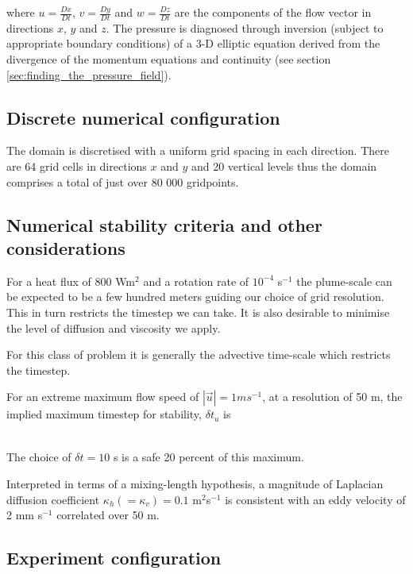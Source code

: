 \noindent where $u=\frac{Dx}{Dt}$, $v=\frac{Dy}{Dt}$  and 
$w=\frac{Dz}{Dt}$ are the components of the
flow vector in directions $x$, $y$ and $z$. 
The pressure is diagnosed through inversion (subject to appropriate boundary
conditions) of a 3-D elliptic equation derived from the divergence of the momentum 
equations and continuity (see section \ref{sec:finding_the_pressure_field}).
\\

\subsection{Discrete numerical configuration}

The domain is discretised with a uniform grid spacing in each direction. There are 64
grid cells in directions $x$ and $y$ and 20 vertical levels thus the domain
comprises a total of just over 80 000 gridpoints.

\subsection{Numerical stability criteria and other considerations}

For a heat flux of 800 Wm$^2$ and a rotation rate of $10^{-4}$ s$^{-1}$ the
plume-scale can be expected to be a few hundred meters guiding our choice of grid
resolution. This in turn restricts the timestep we can take. It is also desirable to 
minimise the level of diffusion and viscosity we apply.

For this class of problem it is generally the advective time-scale which restricts 
the timestep. 

For an extreme maximum flow speed of $ | \vec{u} | = 1 ms^{-1}$, at a resolution of
50 m, the implied maximum timestep for stability, $\delta t_u$ is 

\begin{eqnarray}
\label{EQ:eg-bconv-advectiveCFLcondition}
\end{eqnarray}

The choice of $\delta t = 10$ s is a safe 20 percent of this maximum.
 
Interpreted in terms of a mixing-length hypothesis, a magnitude of Laplacian
diffusion coefficient $\kappa_h (=
\kappa_v) = 0.1$ m$^2$s$^{-1}$ is consistent with an eddy velocity of 2 mm s$^{-1}$
correlated over 50 m.  

\subsection{Experiment configuration}

